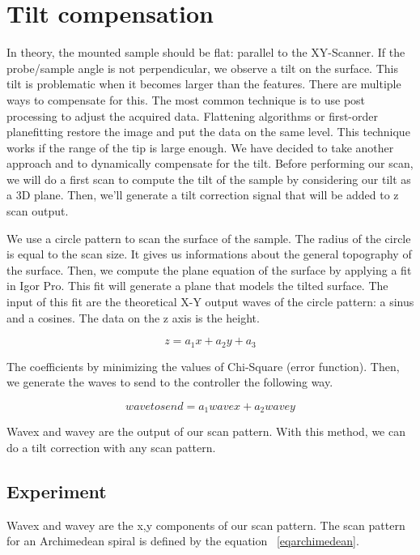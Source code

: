 \section{Tilt compensation}

In theory, the mounted sample should be flat: parallel to the XY-Scanner. If the probe/sample angle is not perpendicular, we observe a tilt on the surface. This tilt is problematic when it becomes larger than the features. There are multiple ways to compensate for this. The most common technique is to use post processing to adjust the acquired data. Flattening algorithms or first-order planefitting restore the image and put the data on the same level. This technique works if the range of the tip is large enough. We have decided to take another approach and to dynamically compensate for the tilt. Before performing our scan, we will do a first scan to compute the tilt of the sample by considering our tilt as a 3D plane. Then, we'll generate a tilt correction signal that will be added to z scan output.

We use a circle pattern to scan the surface of the sample. The radius of the circle is equal to the scan size. It gives us informations about the general topography of the surface. Then, we compute the plane equation of the surface by applying a fit in Igor Pro. This fit will generate a plane that models the tilted surface. The input of this fit are the theoretical X-Y output waves of the circle pattern: a sinus and a cosines. The data on the z axis is the height.

\begin{equation}\label{eqn:planeeq}
z = a_1 x + a_2 y + a_3 
\end{equation}

The coefficients by minimizing the values of Chi-Square (error function). Then, we generate the waves to send to the controller the following way.

\begin{equation}\label{eqn:sendwave}
wavetosend = a_1 wavex + a_2 wavey 
\end{equation}

Wavex and wavey are the output of our scan pattern. With this method, we can do a tilt correction with any scan pattern.


\subsection{Experiment}

Wavex and wavey are the x,y components of our scan pattern. The scan pattern for an Archimedean spiral is defined by the equation  ~\ref{eqarchimedean}.


